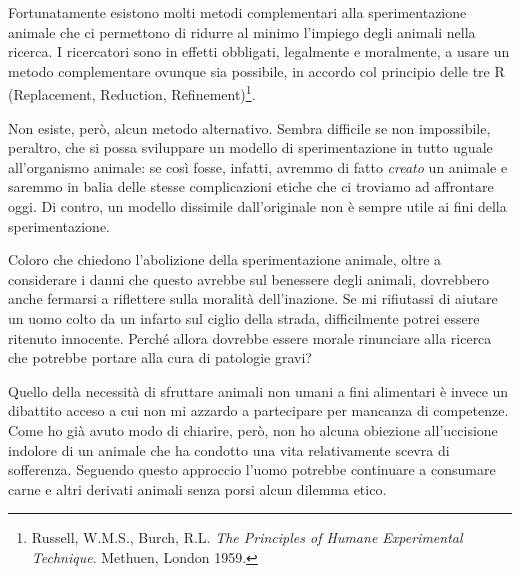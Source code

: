 \documentclass[a4paper,11pt,oneside,article]{memoir}
\begin{document}
Fortunatamente esistono molti metodi complementari alla sperimentazione animale
che ci permettono di ridurre al minimo l'impiego degli animali nella ricerca. I
ricercatori sono in effetti obbligati, legalmente e moralmente, a usare un
metodo complementare ovunque sia possibile, in accordo col principio delle tre R
(Replacement, Reduction, Refinement)\footnote{Russell, W.M.S., Burch, R.L.
\emph{The Principles of Humane Experimental Technique}. Methuen, London 1959.}.

Non esiste, però, alcun metodo alternativo. Sembra difficile se non impossibile,
peraltro, che si possa sviluppare un modello di sperimentazione in tutto uguale
all'organismo animale: se così fosse, infatti, avremmo di fatto \emph{creato} un
animale e saremmo in balia delle stesse complicazioni etiche che ci troviamo ad
affrontare oggi. Di contro, un modello dissimile dall'originale non è sempre
utile ai fini della sperimentazione.

Coloro che chiedono l'abolizione della sperimentazione animale, oltre a
considerare i danni che questo avrebbe sul benessere degli animali, dovrebbero
anche fermarsi a riflettere sulla moralità dell'inazione. Se mi rifiutassi di
aiutare un uomo colto da un infarto sul ciglio della strada, difficilmente
potrei essere ritenuto innocente. Perché allora dovrebbe essere morale
rinunciare alla ricerca che potrebbe portare alla cura di patologie gravi?

Quello della necessità di sfruttare animali non umani a fini alimentari è invece
un dibattito acceso a cui non mi azzardo a partecipare per mancanza di
competenze. Come ho già avuto modo di chiarire, però, non ho alcuna obiezione
all'uccisione indolore di un animale che ha condotto una vita relativamente
scevra di sofferenza. Seguendo questo approccio l'uomo potrebbe continuare a
consumare carne e altri derivati animali senza porsi alcun dilemma etico.

\end{document}

